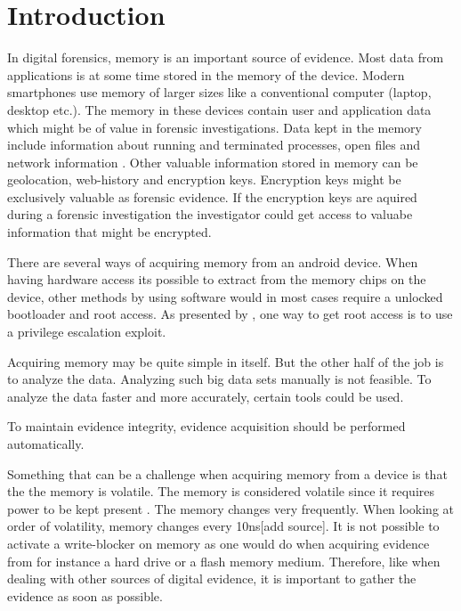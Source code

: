 \section{Introduction}


In digital forensics, memory is an important source of evidence. Most data from applications
is at some time stored in the memory of the device. Modern smartphones use memory of larger sizes like 
a conventional computer (laptop, desktop etc.). The memory in these devices contain user and 
application data which might be of value in forensic investigations. Data kept in the memory include 
information about running and terminated processes, open files and network information 
\cite{acq_vol_android_mem}. Other valuable information stored in memory can be geolocation, web-history 
and encryption keys. Encryption keys might be exclusively valuable as forensic evidence.
If the encryption keys are aquired during a forensic investigation the investigator could get access to 
valuabe information that might be encrypted.

There are several ways of acquiring memory from an android device. When having hardware access its possible to extract from the memory chips on the device, other methods by using software would in most cases require a unlocked bootloader and root access. As presented by \cite{acq_vol_android_mem}, one way to get root access is to use a privilege escalation exploit. %

Acquiring memory may be quite simple in itself. But the other half of the job is to analyze the data.
Analyzing such big data sets manually is not feasible. To analyze the data faster and more accurately, certain tools could be used. 

To maintain evidence integrity, evidence acquisition should be performed automatically.

Something that can be a challenge when acquiring memory from a device is that the the memory is 
volatile. The memory is considered volatile since it requires power to be kept present \cite{the_art_of_mem}.
The memory changes very frequently. When looking at order of volatility, memory changes 
every 10ns[add source]. It is not possible to activate a write-blocker on memory as one would do when 
acquiring evidence from for instance a hard drive or a flash memory medium. Therefore, like when dealing with other sources of digital
evidence, it is important to gather the evidence as soon as possible. 

